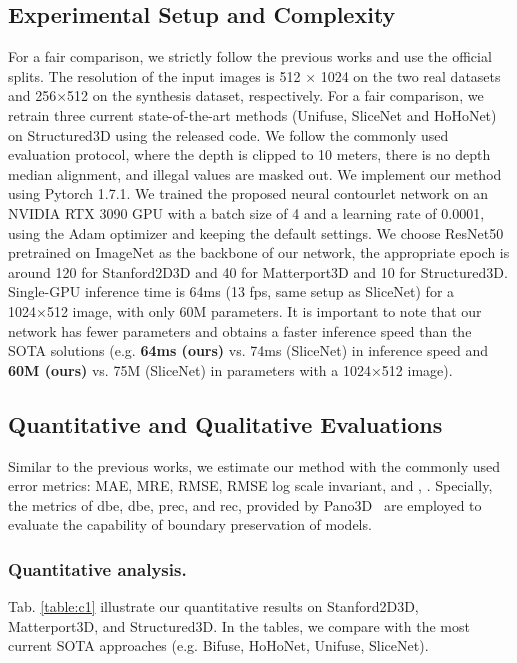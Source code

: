 \documentclass[10pt,times,mathptm,psfig,twocolumn,journals]{IEEEtran}
\begin{document}
 \subsection{Experimental Setup and Complexity}
 For a fair comparison, we strictly follow the previous works and use the official splits. The resolution of the input images is 512 × 1024 on the two real datasets and 256×512 on the synthesis dataset, respectively. For a fair comparison, we retrain three current state-of-the-art methods (Unifuse,  SliceNet and HoHoNet) on Structured3D using the released code. We follow the commonly used evaluation protocol, where the depth is clipped to 10 meters, there is no depth median alignment, and illegal values are masked out. We implement our method using Pytorch 1.7.1. We trained the proposed neural contourlet network on an NVIDIA RTX 3090 GPU with a batch size of 4 and a learning rate of 0.0001, using the Adam optimizer and keeping the default settings. We choose ResNet50 pretrained on ImageNet as the backbone of our network, the appropriate epoch is around 120 for Stanford2D3D and 40 for Matterport3D and 10 for Structured3D. Single-GPU inference time is 64ms (13 fps, same setup as SliceNet) for a 1024×512 image, with only 60M parameters. It is important to note that our network has fewer parameters and obtains a faster inference speed than the SOTA solutions (e.g. \textbf{64ms (ours)} vs. 74ms (SliceNet) in inference speed and \textbf{60M (ours)} vs. 75M (SliceNet) in parameters with a 1024×512 image).
 \subsection{Quantitative and Qualitative Evaluations}
 Similar to the previous works, we estimate our method with the commonly used error metrics: MAE, MRE, RMSE, RMSE log scale invariant, and , . Specially, the metrics of dbe, dbe, prec, and rec,  provided by Pano3D~\cite{albanis2021pano3d} are employed to evaluate the capability of boundary preservation of models.
  
 \subsubsection{Quantitative analysis.} Tab. \ref{table:c1} illustrate our quantitative results on Stanford2D3D, Matterport3D, and Structured3D. In the tables, we compare with the most current SOTA approaches (e.g. Bifuse\cite{2020BiFuse}, HoHoNet\cite{sun2021hohonet}, Unifuse\cite{Jiang_2021}, SliceNet\cite{Pintore_2021_CVPR}).
 
\end{document}
